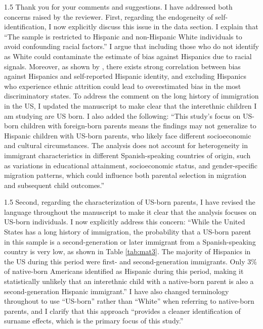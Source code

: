 \documentclass[12pt,english]{article}
\newcommand{\rrxspc}{1.5}
\begin{document}
\begin{refsection}
\begin{spacing}{\rrxspc}
    Thank you for your comments and suggestions. I have addressed both concerns raised by the reviewer. First, regarding the endogeneity of self-identification, I now explicitly discuss this issue in the data section. I explain that ``The sample is restricted to Hispanic and non-Hispanic White individuals to avoid confounding racial factors.'' I argue that including those who do not identify as White could contaminate the estimate of bias against Hispanics due to racial signals. Moreover, as shown by \textcite{hadah2024effect}, there exists strong correlation between bias against Hispanics and self-reported Hispanic identity, and excluding Hispanics who experience ethnic attrition could lead to overestimated bias in the most discriminatory states. To address the comment on the long history of immigration in the US, I updated the manuscript to make clear that the interethnic children I am studying are US born. I also added the following: ``This study's focus on US-born children with foreign-born parents means the findings may not generalize to Hispanic children with US-born parents, who likely face different socioeconomic and cultural circumstances. The analysis does not account for heterogeneity in immigrant characteristics in different Spanish-speaking countries of origin, such as variations in educational attainment, socioeconomic status, and gender-specific migration patterns, which could influence both parental selection in migration and subsequent child outcomes.''
\end{spacing}    

\begin{spacing}{\rrxspc}
    Second, regarding the characterization of US-born parents, I have revised the language throughout the manuscript to make it clear that the analysis focuses on US-born individuals. I now explicitly address this concern: ``While the United States has a long history of immigration, the probability that a US-born parent in this sample is a second-generation or later immigrant from a Spanish-speaking country is very low, as shown in Table \ref{tab:mat3}. The majority of Hispanics in the US during this period were first- and second-generation immigrants. Only 3\% of native-born Americans identified as Hispanic during this period, making it statistically unlikely that an interethnic child with a native-born parent is also a second-generation Hispanic immigrant.'' I have also changed terminology throughout to use ``US-born'' rather than ``White'' when referring to native-born parents, and I clarify that this approach ``provides a cleaner identification of surname effects, which is the primary focus of this study.''
\end{spacing}


\end{refsection}
\end{document}
